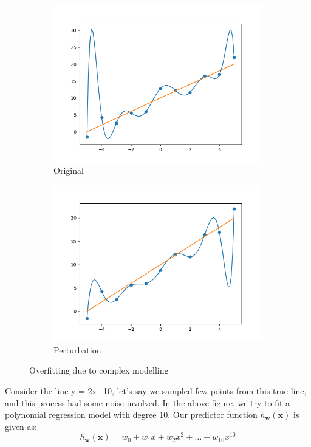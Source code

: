 \documentclass{report}
\newcommand{\w}{\mathbf{w}} %
\newcommand{\x}{\mathbf{x}}
\begin{document}
\begin{figure}[H]
  \begin{subfigure}{0.45\textwidth}
    \centering
    \includegraphics[scale=0.45]{images/07.png}
    \caption{Original}
  \end{subfigure}
  \hfill
  \begin{subfigure}{0.45\textwidth}
    \centering
    \includegraphics[scale=0.45]{images/08.png}
    \caption{Perturbation}
  \end{subfigure}
  \caption{Overfitting due to complex modelling}
\end{figure}

Consider the line y = 2x+10, let's say we sampled few points from this true line, and this process had some noise involved. In the above figure, we try to fit a polynomial regression model with degree 10. Our predictor function $h_\w(\x)$ is given as:
$$
  h_\w(\x) = w_0 + w_1x + w_2x^2 + \dots + w_{10}x^{10}
$$
\end{document}
